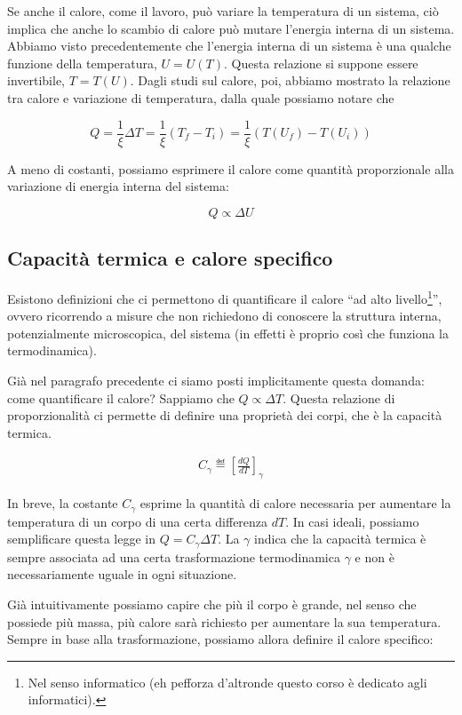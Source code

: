 Se anche il calore, come il lavoro, può variare la temperatura di un sistema,
ciò implica che anche lo scambio di calore può mutare l'energia interna di
un sistema.
Abbiamo visto precedentemente che l'energia interna di un sistema è una qualche
funzione della temperatura, $U = U(T)$. Questa relazione si suppone essere
invertibile, $T = T(U)$. Dagli studi sul calore, poi, abbiamo mostrato la
relazione tra calore e variazione di temperatura, dalla quale possiamo notare
che

\[ Q = \frac{1}{\xi}\Delta T = \frac{1}{\xi}(T_f - T_i) = \frac{1}{\xi}(T(U_f) - T(U_i)) \]

\noindent A meno di costanti, possiamo esprimere il calore come quantità
proporzionale alla variazione di energia interna del sistema:

\[ Q \propto \Delta U \]


\subsection{Capacità termica e calore specifico}
Esistono definizioni che ci permettono di quantificare il calore
``ad alto livello\footnote{Nel senso informatico (eh pefforza
d'altronde questo corso è dedicato agli informatici).}'', ovvero
ricorrendo a misure che non richiedono di conoscere la struttura
interna, potenzialmente microscopica, del sistema (in effetti
è proprio così che funziona la termodinamica).

Già nel paragrafo
precedente ci siamo posti implicitamente questa domanda: come
quantificare il calore? Sappiamo che $Q \propto \Delta T$.
Questa relazione di proporzionalità ci permette di definire una
proprietà dei corpi, che è la capacità termica.

\begin{align}
    C_\gamma \eqdef \left[ \frac{dQ}{dT} \right]_\gamma
\end{align}

\noindent In breve, la costante $C_\gamma$ esprime la quantità di calore
necessaria per aumentare la temperatura di un corpo di una
certa differenza $dT$. In casi ideali, possiamo semplificare
questa legge in $Q = C_\gamma \Delta T$. La $\gamma$ indica che
la capacità termica è sempre associata ad una certa trasformazione
termodinamica $\gamma$ e non è necessariamente uguale in ogni
situazione.

Già intuitivamente possiamo capire che più il corpo è grande,
nel senso che possiede più massa, più calore sarà richiesto per
aumentare la sua temperatura. Sempre in base alla trasformazione,
possiamo allora definire il calore specifico:

